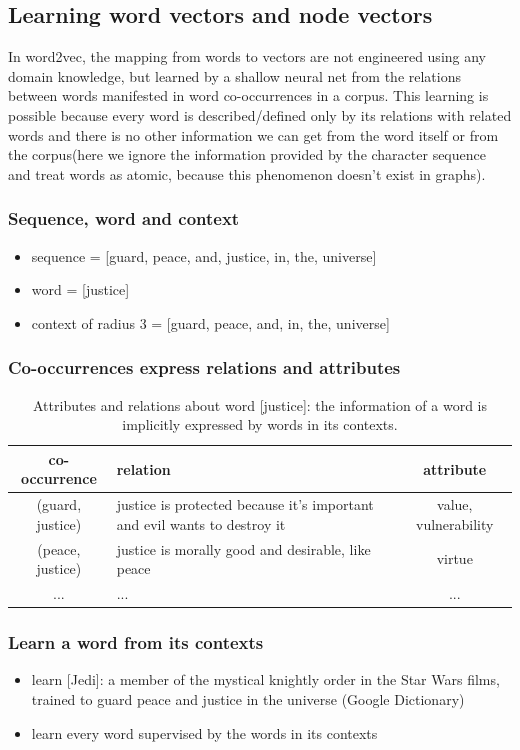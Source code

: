 \documentclass{article}
\begin{document}
\subsection{Learning word vectors and node vectors}
In word2vec, the mapping from words to vectors are not engineered using any domain knowledge, but learned by a shallow neural net from the relations between words manifested in word co-occurrences in a corpus. This learning is possible because every word is described/defined only by its relations with related words and there is no other information we can get from the word itself or from the corpus(here we ignore the information provided by the character sequence and treat words as atomic, because this phenomenon doesn't exist in graphs).

\subsubsection{Sequence, word and context}
\begin{itemize}
	\item sequence = [guard, peace, and, justice, in, the, universe]
	\item word = [justice]
	\item context of radius 3 = [guard, peace, and, in, the, universe]
\end{itemize}
\subsubsection{Co-occurrences express relations and attributes}
\begin{table}[H]
	\centering
	\begin{tabularx}{\textwidth}{|c|X|c|} \hline
		co-occurrence & relation & attribute \\ \hline
		(guard, justice) & justice is protected because it's important and evil 
		wants to destroy it & value, vulnerability \\ \hline
		(peace, justice) & justice is morally good and desirable, like peace & 
		virtue \\ \hline
		... & ... & ... \\ \hline
	\end{tabularx}
	\caption{Attributes and relations about word [justice]: the information of 
	a word is implicitly expressed by words in its contexts.}
	\label{tab:cooccurrences}
\end{table}
\subsubsection{Learn a word from its contexts}
\begin{itemize}
	\item learn [Jedi]: a member of the mystical knightly order in the Star 
	Wars films, trained to guard peace and justice in the universe (Google 
	Dictionary)
	\item learn every word supervised by the words in its contexts
\end{itemize}
\end{document}
